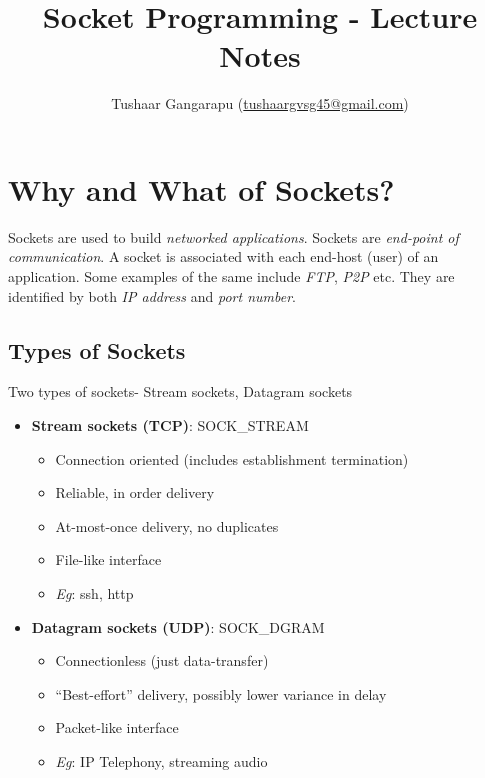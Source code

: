 \documentclass[10pt]{article}
\title{\textbf{Socket Programming - Lecture Notes}}
\author{Tushaar Gangarapu (\href{mailto:tushaargvsg45@gmail.com}{tushaargvsg45@gmail.com})}
\begin{document}
\lstset{showstringspaces=false}
\maketitle

\section{Why and What of Sockets?}
Sockets are used to build \textit{networked applications}. Sockets are \textit{end-point of communication}. A socket is associated with each end-host (user) of an application. Some examples of the same include \textit{FTP}, \textit{P2P} etc. They are identified by both \textit{IP address} and \textit{port number}.

\subsection{Types of Sockets}
Two types of sockets- Stream sockets, Datagram sockets
\begin{itemize}
\item \textbf{Stream sockets (TCP)}: SOCK\_STREAM
	\begin{itemize}
		\item Connection oriented (includes establishment termination)
		\item Reliable, in order delivery
		\item At-most-once delivery, no duplicates
		\item File-like interface
		\item \textit{Eg}: ssh, http
	\end{itemize}	 

\item \textbf{Datagram sockets (UDP)}: SOCK\_DGRAM
	\begin{itemize}
		\item Connectionless (just data-transfer)
		\item “Best-effort” delivery, possibly lower variance in delay	
		\item Packet-like interface
		\item \textit{Eg}: IP Telephony, streaming audio
	\end{itemize}	 
\end{itemize}
\end{document}

